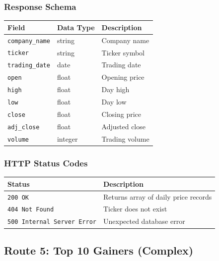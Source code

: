 \documentclass[11pt]{article}
\begin{document}
\subsubsection*{Response Schema}

\begin{center}
\small
\begin{tabular}{l l p{7cm}}
\toprule
\textbf{Field} & \textbf{Data Type} & \textbf{Description} \\
\midrule
\texttt{company\_name}  & string  & Company name \\
\texttt{ticker}         & string  & Ticker symbol \\
\texttt{trading\_date}  & date    & Trading date \\
\texttt{open}           & float   & Opening price \\
\texttt{high}           & float   & Day high \\
\texttt{low}            & float   & Day low \\
\texttt{close}          & float   & Closing price \\
\texttt{adj\_close}     & float   & Adjusted close \\
\texttt{volume}         & integer & Trading volume \\
\bottomrule
\end{tabular}
\end{center}

\subsubsection*{HTTP Status Codes}

\begin{center}
\small
\begin{tabular}{l p{8cm}}
\toprule
\textbf{Status} & \textbf{Description} \\
\midrule
\texttt{200 OK} & Returns array of daily price records \\
\texttt{404 Not Found} & Ticker does not exist \\
\texttt{500 Internal Server Error} & Unexpected database error \\
\bottomrule
\end{tabular}
\end{center}

\newpage
\subsection{Route 5: Top 10 Gainers (Complex)}
\end{document}
